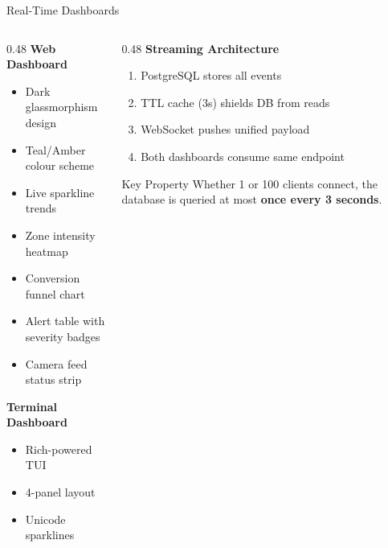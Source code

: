\documentclass[aspectratio=169, 11pt]{beamer}
\begin{document}
\begin{frame}{Real-Time Dashboards}
  \begin{columns}[T]
    \begin{column}{0.48\textwidth}
      \textbf{Web Dashboard}
      \begin{itemize}
        \item Dark glassmorphism design
        \item Teal/Amber colour scheme
        \item Live sparkline trends
        \item Zone intensity heatmap
        \item Conversion funnel chart
        \item Alert table with severity badges
        \item Camera feed status strip
      \end{itemize}

      \vspace{0.2cm}
      \textbf{Terminal Dashboard}
      \begin{itemize}
        \item Rich-powered TUI
        \item 4-panel layout
        \item Unicode sparklines
      \end{itemize}
    \end{column}
    \begin{column}{0.48\textwidth}
      \textbf{Streaming Architecture}
      \begin{enumerate}
        \item PostgreSQL stores all events
        \item TTL cache (3s) shields DB from reads
        \item WebSocket pushes unified payload
        \item Both dashboards consume same endpoint
      \end{enumerate}

      \vspace{0.3cm}
      \begin{block}{Key Property}
        Whether 1 or 100 clients connect, the database
        is queried at most \textbf{once every 3 seconds}.
      \end{block}
    \end{column}
  \end{columns}
\end{frame}

\end{document}
